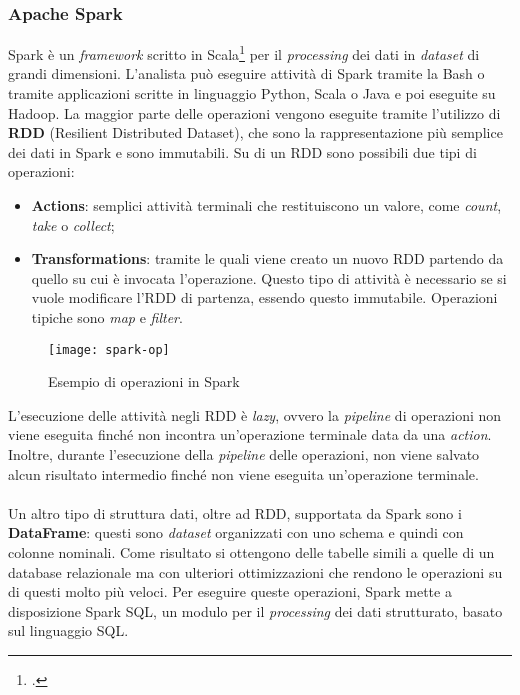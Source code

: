 \subsubsection{Apache Spark}
Spark è un \textit{framework} scritto in Scala\footcite{https://www.scala-lang.org/} per il \textit{processing} dei dati in \textit{dataset} di grandi dimensioni.
L'analista può eseguire attività di Spark tramite la \gls{Bash} o tramite applicazioni scritte in linguaggio Python, Scala o Java e poi eseguite su Hadoop.
La maggior parte delle operazioni vengono eseguite tramite l'utilizzo di \textbf{RDD} (Resilient Distributed Dataset), che sono la rappresentazione più semplice dei dati in Spark e sono immutabili. Su di un RDD sono possibili due tipi di operazioni:
\begin{itemize}
	\item \textbf{Actions}: semplici attività terminali che restituiscono un valore, come \textit{count}, \textit{take} o \textit{collect}; 
	\item \textbf{Transformations}: tramite le quali viene creato un nuovo RDD partendo da quello su cui è invocata l'operazione. Questo tipo di attività è necessario se si vuole modificare l'RDD di partenza, essendo questo immutabile. Operazioni tipiche sono \textit{map} e \textit{filter}.
\end{itemize}
\begin{figure}[!h]
	\centering
	\texttt{[image: spark-op]}
	\caption{Esempio di operazioni in Spark}
\end{figure}
L'esecuzione delle attività negli RDD è \textit{lazy}, ovvero la \textit{pipeline} di operazioni non viene eseguita finché non incontra un'operazione terminale data da una \textit{action}. Inoltre, durante l'esecuzione della \textit{pipeline} delle operazioni, non viene salvato alcun risultato intermedio finché non viene eseguita un'operazione terminale.\\\\
Un altro tipo di struttura dati, oltre ad RDD, supportata da Spark sono i \textbf{DataFrame}: questi sono \textit{dataset} organizzati con uno schema e quindi con colonne nominali. Come risultato si ottengono delle tabelle simili a quelle di un database relazionale ma con ulteriori ottimizzazioni che rendono le operazioni su di questi molto più veloci. Per eseguire queste operazioni, Spark mette a disposizione Spark SQL, un modulo per il \textit{processing} dei dati strutturato, basato sul linguaggio SQL.
\newpage
